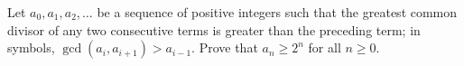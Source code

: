 \documentclass{subfile}
\begin{document}
%
%
%
%

	\begin{problem}
		Let $ a_0, a_1, a_2, \dots$ be a sequence of positive integers such that the greatest common divisor of any two consecutive terms is greater than the preceding term; in symbols, $ \gcd (a_i, a_{i+ 1}) > a_{i - 1}$. Prove that $ a_n\ge 2^n$ for all $ n\ge 0$. %
	\end{problem}
\end{document}
